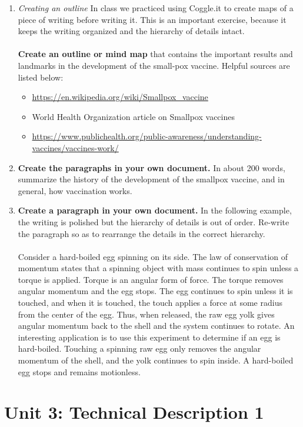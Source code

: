 \documentclass{article}
\begin{document}
\begin{enumerate}
\item \textit{Creating an outline} In class we practiced using Coggle.it to create maps of a piece of writing before writing it.  This is an important exercise, because it keeps the writing organized and the hierarchy of details intact.  \\ \\
\textbf{Create an outline or mind map} that contains the important results and landmarks in the development of the small-pox vaccine.  Helpful sources are listed below:
\begin{itemize}
\item \url{https://en.wikipedia.org/wiki/Smallpox_vaccine}
\item World Health Organization article on Smallpox vaccines
\item \url{https://www.publichealth.org/public-awareness/understanding-vaccines/vaccines-work/}
\end{itemize}
\item \textbf{Create the paragraphs in your own document.} In about 200 words, summarize the history of the development of the smallpox vaccine, and in general, how vaccination works.
\item \textbf{Create a paragraph in your own document.}  In the following example, the writing is polished but the hierarchy of details is out of order.  Re-write the paragraph so as to rearrange the details in the correct hierarchy. \\ \\

Consider a hard-boiled egg spinning on its side.  The law of conservation of momentum states that a spinning object with mass continues to spin unless a torque is applied.  Torque is an angular form of force.  The torque removes angular momentum and the egg stops.   The egg continues to spin unless it is touched, and when it is touched, the touch applies a force at some radius from the center of the egg.  Thus, when released, the raw egg yolk gives angular momentum back to the shell and the system continues to rotate.  An interesting application is to use this experiment to determine if an egg is hard-boiled.  Touching a spinning raw egg only removes the angular momentum of the shell, and the yolk continues to spin inside.  A hard-boiled egg stops and remains motionless.
\end{enumerate}

\section{Unit 3: Technical Description 1}
\end{document}
